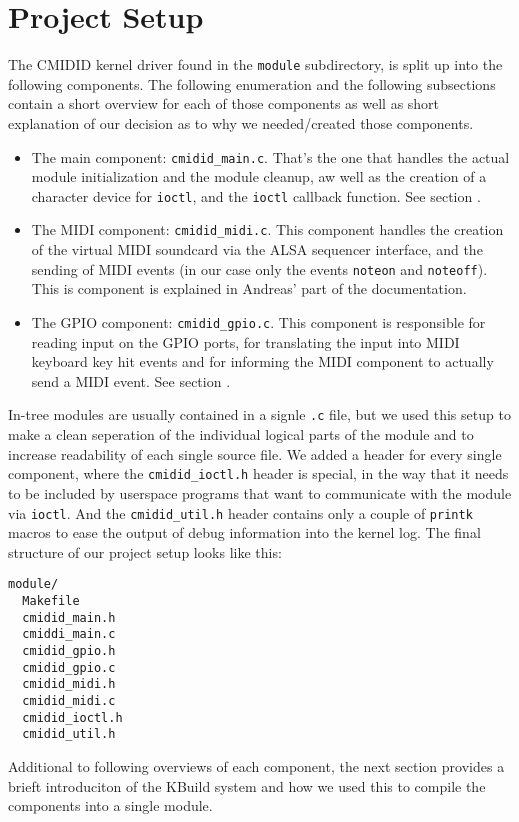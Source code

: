 \documentclass[paper=a4,fontsize=11pt,twocolumn,pagesize,bibtotoc]{scrartcl}
\begin{document}
\section{Project Setup}
\label{michael:setup}

The CMIDID kernel driver found in the \texttt{module} subdirectory, is split
up into the following components. The following enumeration and the following
subsections contain a short overview for each of those components as well as 
short explanation of our decision as to why we needed/created those components.
\begin{itemize}
  \item The main component: \texttt{cmidid\_main.c}. That's the one that 
    handles the actual module initialization and the module cleanup, aw well 
    as the creation of a character device for \texttt{ioctl}, and the 
    \texttt{ioctl} callback function. See section \textbf{}.
  \item The MIDI component: \texttt{cmidid\_midi.c}. This component handles 
    the creation of the virtual MIDI soundcard via the ALSA sequencer 
    interface, and the sending of MIDI events (in our case only the events 
    \texttt{noteon} and \texttt{noteoff}). This is component is explained in Andreas' part of the documentation.
  \item The GPIO component: \texttt{cmidid\_gpio.c}. This component is 
    responsible for reading input on the GPIO ports, for translating the 
    input into MIDI keyboard key hit events and for informing the MIDI 
    component to actually send a MIDI event. See section \textbf{}.
\end{itemize}
In-tree modules are usually contained in a signle \texttt{.c} file, but we 
used this setup to make a clean seperation of the individual logical parts of 
the module and to increase readability of each single source file. We added 
a header for every single component, where the \texttt{cmidid\_ioctl.h} header 
is special, in the way that it needs to be included by userspace programs that
want to communicate with the module via \texttt{ioctl}. And the \texttt{cmidid\_util.h}
header contains only a couple of \texttt{printk} macros to ease the output of 
debug information into the kernel log. The final structure of our project 
setup looks like this:
\begin{lstlisting}
module/
  Makefile
  cmidid_main.h
  cmiddi_main.c
  cmidid_gpio.h
  cmidid_gpio.c
  cmidid_midi.h
  cmidid_midi.c
  cmidid_ioctl.h
  cmidid_util.h
\end{lstlisting}
Additional to following overviews of each component, the next section provides
a brieft introduciton of the KBuild system and how we used this to compile 
the components into a single module.
\end{document}
